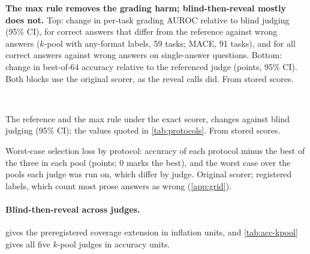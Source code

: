 \begin{table}[htbp]
\centering
\footnotesize
\caption{\textbf{The max rule removes the grading harm; blind-then-reveal mostly does not.} Top: change in per-task grading AUROC relative to blind judging (95\% CI), for correct answers that differ from the reference against wrong answers ($k$-pool with any-format labels, 59 tasks; \textsc{MACE}, 91 tasks), and for all correct answers against wrong answers on single-answer questions. Bottom: change in best-of-64 accuracy relative to the referenced judge (points, 95\% CI). Both blocks use the original scorer, as the reveal calls did. From stored scores.\ph}
\label{tab:protocol-grading}
\begin{adjustbox}{max width=\linewidth}\end{adjustbox}\\[6pt]
\begin{adjustbox}{max width=\linewidth}\end{adjustbox}
\end{table}

\begin{table}[htbp]
\centering
\footnotesize
\caption{The reference and the max rule under the exact scorer, changes against blind judging (95\% CI); the values quoted in \cref{tab:protocols}. From stored scores.\ph}
\label{tab:protocol-exact}
\begin{adjustbox}{max width=\linewidth}\end{adjustbox}
\end{table}

\begin{table}[htbp]
\centering
\footnotesize
\caption{Worst-case selection loss by protocol: accuracy of each protocol minus the best of the three in each pool (points; 0 marks the best), and the worst case over the pools each judge was run on, which differ by judge. Original scorer; registered labels, which count most prose answers as wrong (\cref{app:grid}).\ph}
\label{tab:regret}
\begin{adjustbox}{max width=\linewidth}\end{adjustbox}
\end{table}

\paragraph{Blind-then-reveal across judges.}
 gives the preregistered coverage extension in inflation units, and \cref{tab:acc-kpool} gives all five $k$-pool judges in accuracy units.

